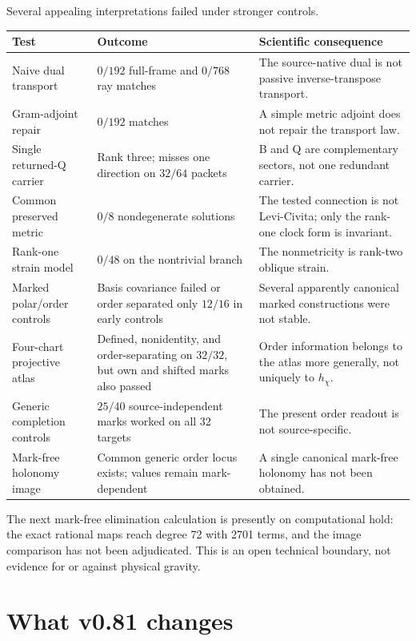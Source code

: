 \documentclass[12pt,a4paper,twoside]{article}
\begin{document}
Several appealing interpretations failed under stronger controls.

\begin{longtable}{>{\raggedright\arraybackslash}p{}>{\raggedright\arraybackslash}p{}>{\raggedright\arraybackslash}p{}}
\toprule
Test & Outcome & Scientific consequence \\
\midrule
\endhead
Naive dual transport & $0/192$ full-frame and $0/768$ ray matches & The source-native dual is not passive inverse-transpose transport. \\
Gram-adjoint repair & $0/192$ matches & A simple metric adjoint does not repair the transport law. \\
Single returned-Q carrier & Rank three; misses one direction on $32/64$ packets & B and Q are complementary sectors, not one redundant carrier. \\
Common preserved metric & $0/8$ nondegenerate solutions & The tested connection is not Levi-Civita; only the rank-one clock form is invariant. \\
Rank-one strain model & $0/48$ on the nontrivial branch & The nonmetricity is rank-two oblique strain. \\
Marked polar/order controls & Basis covariance failed or order separated only $12/16$ in early controls & Several apparently canonical marked constructions were not stable. \\
Four-chart projective atlas & Defined, nonidentity, and order-separating on $32/32$, but own and shifted marks also passed & Order information belongs to the atlas more generally, not uniquely to $h_\chi$. \\
Generic completion controls & $25/40$ source-independent marks worked on all 32 targets & The present order readout is not source-specific. \\
Mark-free holonomy image & Common generic order locus exists; values remain mark-dependent & A single canonical mark-free holonomy has not been obtained. \\
\bottomrule
\end{longtable}

The next mark-free elimination calculation is presently on computational hold: the exact rational maps reach degree 72 with 2701 terms, and the image comparison has not been adjudicated. This is an open technical boundary, not evidence for or against physical gravity.

\section{What v0.81 changes}
\end{document}
